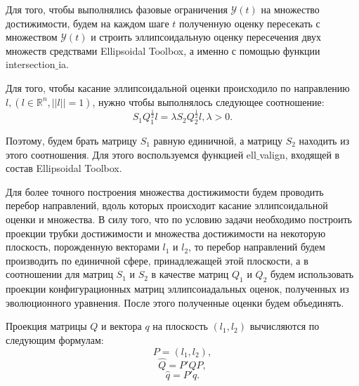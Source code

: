 \documentclass[a4paper, 14pt]{article}
\begin{document}
		Для того, чтобы выполнялись фазовые ограничения $\mathcal{Y}(t)$ на множество достижимости, будем на каждом шаге $t$ полученную оценку пересекать с множеством $\mathcal{Y}(t)$ и строить эллипсоидальную оценку пересечения двух множеств средствами Ellipsoidal Toolbox, а именно с помощью функции intersection$\_$ia. 
		
		Для того, чтобы касание эллипсоидальной оценки происходило по направлению $l, (l \in \mathbb{R}^n, || l || = 1)$, нужно чтобы выполнялось следующее соотношение:
		$$
			S_1 Q_1^{\frac{1}{2}} l = \lambda S_2 Q_2^{\frac{1}{2}} l, \lambda > 0.
		$$
		
		Поэтому, будем брать матрицу $S_1$ равную единичной, а матрицу $S_2$ находить из этого соотношения. Для этого воспользуемся функцией ell$\_$valign, входящей в состав Ellipsoidal Toolbox.
		
		Для более точного построения множества достижимости будем проводить перебор направлений, вдоль которых происходит касание эллипсоидальной оценки и множества. В силу того, что по условию задачи необходимо построить проекции трубки достижимости и множества достижимости на некоторую плоскость, порожденную векторами $l_1$ и $l_2$, то перебор направлений будем производить по единичной сфере, принадлежащей этой плоскости, а в соотношении для матриц $S_1$ и $S_2$ в качестве матриц $Q_1$ и $Q_2$ будем использовать проекции конфигурационных матриц эллипсоиадальных оценок, полученных из эволюционного уравнения. После этого полученные оценки будем объединять.
		
		Проекция матрицы $Q$ и вектора $q$ на плоскость $(l_1, l_2)$ вычисляются по следующим формулам:
		$$
			P = (l_1, l_2),
		$$
		$$
			\widehat{Q} = P' Q P,
		$$ 
		$$
			\widehat{q} = P' q.
		$$
							
        
        
\end{document}
